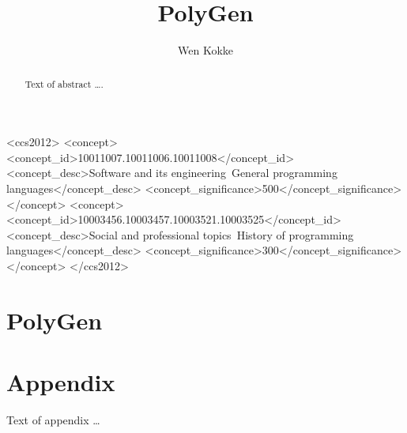 \documentclass[sigplan,10pt,review,anonymous]{acmart}\settopmatter{printfolios=true,printccs=false,printacmref=false}
\begin{document}
\title{PolyGen}

\author{Wen Kokke}



\begin{abstract}
Text of abstract \ldots.
\end{abstract}


\begin{CCSXML}
<ccs2012>
<concept>
<concept_id>10011007.10011006.10011008</concept_id>
<concept_desc>Software and its engineering~General programming languages</concept_desc>
<concept_significance>500</concept_significance>
</concept>
<concept>
<concept_id>10003456.10003457.10003521.10003525</concept_id>
<concept_desc>Social and professional topics~History of programming languages</concept_desc>
<concept_significance>300</concept_significance>
</concept>
</ccs2012>
\end{CCSXML}




\maketitle

\section{PolyGen}






\appendix
\section{Appendix}

Text of appendix \ldots
\end{document}
